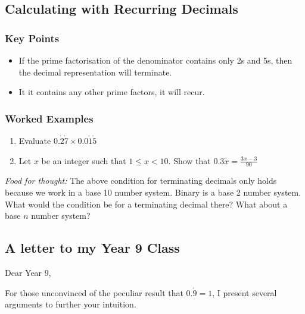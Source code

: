 \documentclass{article}
\begin{document}
\newpage

\subsection*{Calculating with Recurring Decimals}

\subsubsection*{Key Points}
\begin{itemize}
    \item If the prime factorisation of the denominator contains only 2s and 5s, then the decimal representation will terminate.
    \item It it contains any other prime factors, it will recur.
\end{itemize}

\subsubsection*{Worked Examples}

\begin{enumerate}
    \item Evaluate $0.\dot{2}\dot{7}\times 0.0\dot{1}\dot{5}$ \vspace{6cm}
    \item Let $x$ be an integer such that $1\leq x<10$. Show that $0.3\dot{x} = \frac{3x-3}{90}$
\end{enumerate}
\begin{center}
\end{center}


\vfill


\textit{Food for thought:} The above condition for terminating decimals only holds because we work in a base 10 number system. Binary is a base 2 number system. What would the condition be for a terminating decimal there? What about a base \(n\) number system?

\newpage
\subsection*{A letter to my Year 9 Class}

Dear Year 9,

For those unconvinced of the peculiar result that $0.\dot{9} = 1$, I present several arguments to further your intuition.
\end{document}
